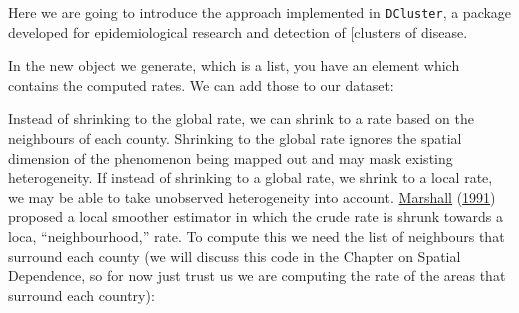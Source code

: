 \documentclass[
]{book}
\newenvironment{Shaded}{\begin{snugshade}}{\end{snugshade}}
\newcommand{\AttributeTok}[1]{\textcolor[rgb]{0.77,0.63,0.00}{#1}}
\newcommand{\DecValTok}[1]{\textcolor[rgb]{0.00,0.00,0.81}{#1}}
\newcommand{\FunctionTok}[1]{\textcolor[rgb]{0.00,0.00,0.00}{#1}}
\newcommand{\NormalTok}[1]{#1}
\newcommand{\OtherTok}[1]{\textcolor[rgb]{0.56,0.35,0.01}{#1}}
\newcommand{\SpecialCharTok}[1]{\textcolor[rgb]{0.00,0.00,0.00}{#1}}
\newcommand{\StringTok}[1]{\textcolor[rgb]{0.31,0.60,0.02}{#1}}
\begin{document}
Here we are going to introduce the approach implemented in \texttt{DCluster}, a package developed for epidemiological research and detection of {[}clusters of disease.

\begin{Shaded}
\end{Shaded}

In the new object we generate, which is a list, you have an element which contains the computed rates. We can add those to our dataset:

\begin{Shaded}
\end{Shaded}

Instead of shrinking to the global rate, we can shrink to a rate based on the neighbours of each county. Shrinking to the global rate ignores the spatial dimension of the phenomenon being mapped out and may mask existing heterogeneity. If instead of shrinking to a global rate, we shrink to a local rate, we may be able to take unobserved heterogeneity into account. \protect\hyperlink{ref-Marshall_1991}{Marshall} (\protect\hyperlink{ref-Marshall_1991}{1991}) proposed a local smoother estimator in which the crude rate is shrunk towards a loca, ``neighbourhood,'' rate. To compute this we need the list of neighbours that surround each county (we will discuss this code in the Chapter on Spatial Dependence, so for now just trust us we are computing the rate of the areas that surround each country):

\begin{Shaded}
\end{Shaded}
\end{document}
